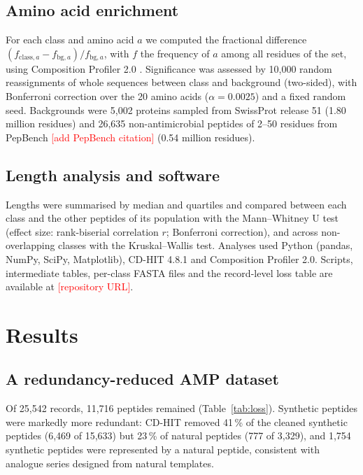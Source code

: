\documentclass[11pt,a4paper]{article}
\newcommand{\todo}[1]{\textcolor{red}{[#1]}}
\begin{document}
\subsection{Amino acid enrichment}
For each class and amino acid $a$ we computed the fractional difference $(f_{\text{class},a} - f_{\text{bg},a})/f_{\text{bg},a}$, with $f$ the frequency of $a$ among all residues of the set,
using Composition Profiler 2.0 \cite{vacic2007}. Significance was assessed by 10{,}000 random reassignments of whole sequences between class and background (two-sided), with Bonferroni correction over the
20 amino acids ($\alpha = 0.0025$) and a fixed random seed. Backgrounds were 5{,}002 proteins sampled from SwissProt release 51 \cite{uniprot2023} (1.80 million residues) and 26{,}635 non-antimicrobial peptides
of 2--50 residues from PepBench \todo{add PepBench citation} (0.54 million residues).

\subsection{Length analysis and software}
Lengths were summarised by median and quartiles and compared between each class and the other peptides of its population with the Mann--Whitney U test (effect size: rank-biserial correlation $r$;
Bonferroni correction), and across non-overlapping classes with the Kruskal--Wallis test. Analyses used Python (pandas, NumPy, SciPy, Matplotlib), CD-HIT 4.8.1 and Composition Profiler 2.0.
Scripts, intermediate tables, per-class FASTA files and the record-level loss table are available at \todo{repository URL}.

\section{Results}
\subsection{A redundancy-reduced AMP dataset}
Of 25{,}542 records, 11{,}716 peptides remained (Table~\ref{tab:loss}). Synthetic peptides were markedly more redundant: CD-HIT removed 41\,\% of the cleaned synthetic peptides (6{,}469 of 15{,}633)
but 23\,\% of natural peptides (777 of 3{,}329), and 1{,}754 synthetic peptides were represented by a natural peptide, consistent with analogue series designed from natural templates.
\end{document}
